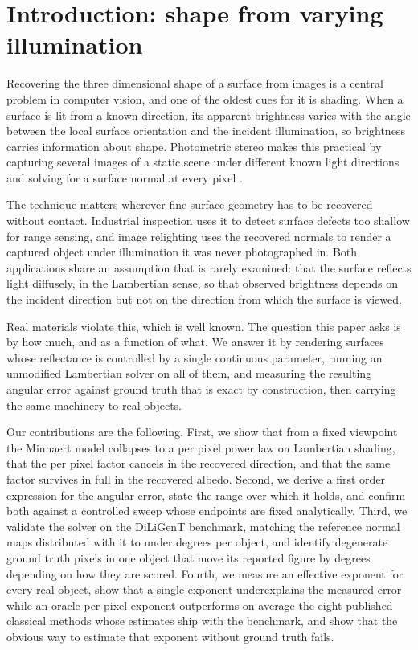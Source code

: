 \documentclass[10pt,twocolumn,letterpaper]{article}
\begin{document}
\section{Introduction: shape from varying illumination}

Recovering the three dimensional shape of a surface from images is a central
problem in computer vision, and one of the oldest cues for it is shading. When a
surface is lit from a known direction, its apparent brightness varies with the
angle between the local surface orientation and the incident illumination, so
brightness carries information about shape. Photometric stereo makes this
practical by capturing several images of a static scene under different known
light directions and solving for a surface normal at every pixel
\cite{woodham1980}.

The technique matters wherever fine surface geometry has to be recovered without
contact. Industrial inspection uses it to detect surface defects too shallow for
range sensing, and image relighting uses the recovered normals to render a
captured object under illumination it was never photographed in. Both
applications share an assumption that is rarely examined: that the surface
reflects light diffusely, in the Lambertian sense, so that observed brightness
depends on the incident direction but not on the direction from which the
surface is viewed.

Real materials violate this, which is well known. The question this paper asks
is by how much, and as a function of what. We answer it by rendering surfaces
whose reflectance is controlled by a single continuous parameter, running an
unmodified Lambertian solver on all of them, and measuring the resulting
angular error against ground truth that is exact by construction, then
carrying the same machinery to real objects.

Our contributions are the following. First, we show that from a fixed viewpoint
the Minnaert model collapses to a per pixel power law on Lambertian shading,
that the per pixel factor cancels in the recovered direction, and that the same
factor survives in full in the recovered albedo. Second, we derive a first
order expression for the angular error, state the range over which it holds,
and confirm both against a controlled sweep whose endpoints are fixed
analytically. Third, we validate the solver on the DiLiGenT benchmark, matching
the reference normal maps distributed with it to under \officialAgree{} degrees
per object, and identify \degeneratePixels{} degenerate ground truth pixels in
one object that move its reported figure by \degenerateSwing{} degrees
depending on how they are scored. Fourth, we measure an effective exponent for
every real object, show that a single exponent underexplains the measured
error while an oracle per pixel exponent outperforms on average the eight
published classical methods whose estimates ship with the benchmark, and show
that the obvious way to estimate that exponent without ground truth fails.
\end{document}
